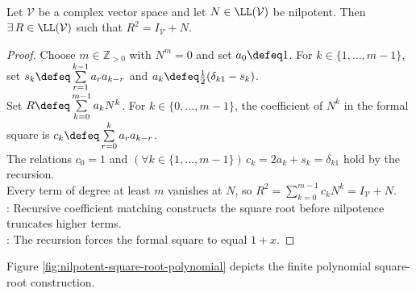 \begin{lemma} \label{lem:identity-plus-nilpotent-square-root} \\
Let $\mathcal{V}$ be a complex vector space and let $N\in\LL(\mathcal{V})$ be nilpotent. Then $\exists\,R\in\LL(\mathcal{V})$ such that $R^2=I_{\mathcal{V}}+N$.
\begin{proof}
Choose $m\in\mathbb{Z}_{>0}$ with $N^m=0$ and set $a_0\defeq1$. For $k\in\{1,\ldots,m-1\}$, set $s_k\defeq\sum\limits_{r=1}^{k-1}a_ra_{k-r}$ and $a_k\defeq\frac{1}{2}(\delta_{k1}-s_k)$.\\
Set $R\defeq\sum\limits_{k=0}^{m-1}a_kN^k$. For $k\in\{0,\ldots,m-1\}$, the coefficient of $N^k$ in the formal square is $c_k\defeq\sum\limits_{r=0}^{k}a_ra_{k-r}$.\\
The relations $c_0=1$ and $(\forall k\in\{1,\ldots,m-1\})\,c_k=2a_k+s_k=\delta_{k1}$ hold by the recursion.\\
Every term of degree at least $m$ vanishes at $N$, so $R^2=\sum\limits_{k=0}^{m-1}c_kN^k=I_{\mathcal{V}}+N$.\\
: Recursive coefficient matching constructs the square root before nilpotence truncates higher terms.\\
: The recursion forces the formal square to equal $1+x$.
\end{proof}
\end{lemma}

\begin{illustrationfigure}[H]
  \centering
  
  \caption{Recursive coefficients and nilpotence reduce the polynomial square to $R^2=I+N$.}
  \label{fig:nilpotent-square-root-polynomial}
\end{illustrationfigure}

Figure \ref{fig:nilpotent-square-root-polynomial} depicts the finite polynomial square-root construction.

